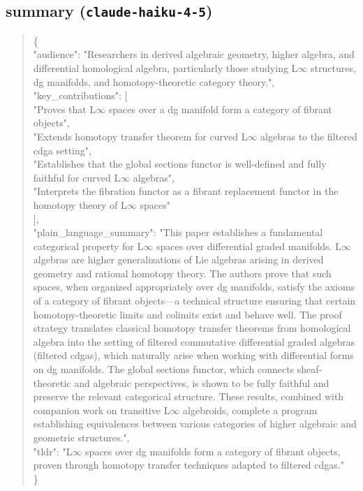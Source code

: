 \documentclass[11pt]{article}
\begin{document}
\subsection*{summary (\texttt{claude-haiku-4-5})}
\begin{quote}\small\ttfamily\raggedright
\{\\
  "audience": "Researchers in derived algebraic geometry, higher algebra, and differential homological algebra, particularly those studying L\ensuremath{\infty} structures, dg manifolds, and homotopy-theoretic category theory.",\\
  "key\_contributions": [\\
    "Proves that L\ensuremath{\infty} spaces over a dg manifold form a category of fibrant objects",\\
    "Extends homotopy transfer theorem for curved L\ensuremath{\infty} algebras to the filtered cdga setting",\\
    "Establishes that the global sections functor is well-defined and fully faithful for curved L\ensuremath{\infty} algebras",\\
    "Interprets the fibration functor as a fibrant replacement functor in the homotopy theory of L\ensuremath{\infty} spaces"\\
  ],\\
  "plain\_language\_summary": "This paper establishes a fundamental categorical property for L\ensuremath{\infty} spaces over differential graded manifolds. L\ensuremath{\infty} algebras are higher generalizations of Lie algebras arising in derived geometry and rational homotopy theory. The authors prove that such spaces, when organized appropriately over dg manifolds, satisfy the axioms of a category of fibrant objects---a technical structure ensuring that certain homotopy-theoretic limits and colimits exist and behave well. The proof strategy translates classical homotopy transfer theorems from homological algebra into the setting of filtered commutative differential graded algebras (filtered cdgas), which naturally arise when working with differential forms on dg manifolds. The global sections functor, which connects sheaf-theoretic and algebraic perspectives, is shown to be fully faithful and preserve the relevant categorical structure. These results, combined with companion work on transitive L\ensuremath{\infty} algebroids, complete a program establishing equivalences between various categories of higher algebraic and geometric structures.",\\
  "tldr": "L\ensuremath{\infty} spaces over dg manifolds form a category of fibrant objects, proven through homotopy transfer techniques adapted to filtered cdgas."\\
\}\\
\end{quote}
\end{document}
